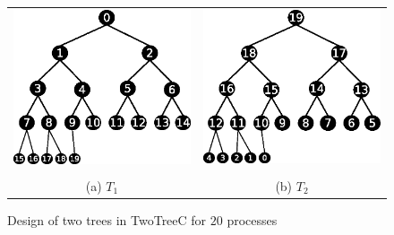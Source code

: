 \documentclass[sigplan,review,anonymous]{acmart}\settopmatter{printfolios=true,printccs=false,printacmref=false}
\begin{document}
\begin{figure}[t]
\begin{tabular}{cc}
\includegraphics[scale=0.46]{images/complete-T1-gap.eps} &  \includegraphics[scale=0.46]{images/complete-T2-gap.eps} \\ \\
(a) $T_1$ & (b) $T_2$ \\
\end{tabular}
\caption{Design of two trees in TwoTreeC for $20$ processes}
\label{fig:twoTreeC}
\end{figure}
\end{document}
